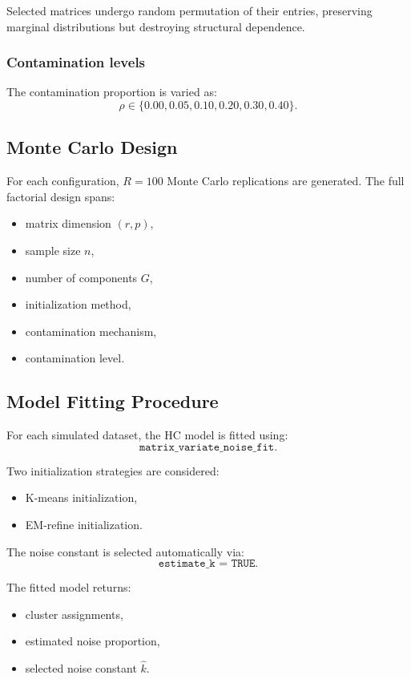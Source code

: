 \documentclass[11pt]{article}
\begin{document}
Selected matrices undergo random permutation of their entries, preserving marginal distributions but destroying structural dependence.

\subsubsection{Contamination levels}

The contamination proportion is varied as:
\[
\rho \in \{0.00, 0.05, 0.10, 0.20, 0.30, 0.40\}.
\]

\subsection{Monte Carlo Design}

For each configuration, $R = 100$ Monte Carlo replications are generated. The full factorial design spans:

\begin{itemize}
    \item matrix dimension $(r,p)$,
    \item sample size $n$,
    \item number of components $G$,
    \item initialization method,
    \item contamination mechanism,
    \item contamination level.
\end{itemize}

\subsection{Model Fitting Procedure}

For each simulated dataset, the HC model is fitted using:
\[
\texttt{matrix\_variate\_noise\_fit}.
\]

Two initialization strategies are considered:
\begin{itemize}
    \item K-means initialization,
    \item EM-refine initialization.
\end{itemize}

The noise constant is selected automatically via:
\[
\texttt{estimate\_k = TRUE}.
\]

The fitted model returns:
\begin{itemize}
    \item cluster assignments,
    \item estimated noise proportion,
    \item selected noise constant $\hat{k}$.
\end{itemize}
\end{document}
